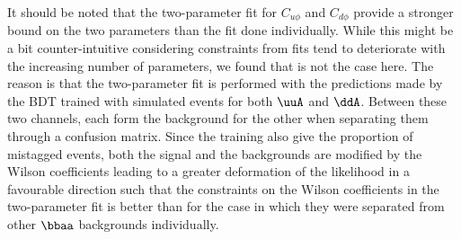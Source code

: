 It should be noted that the two-parameter fit for $C_{u\phi}$ and $C_{d\phi}$ provide a stronger bound on the two parameters than the fit done individually. While this might be a bit counter-intuitive considering constraints from fits tend to deteriorate with the increasing number of parameters, we found that is not the case here. The reason is that the two-parameter fit is performed with the predictions made by the BDT trained with simulated events for both $\uuA$ and $\ddA$. Between these two channels, each form the background for the other when separating them through a confusion matrix. Since the training also give the proportion of mistagged events, both the signal and the backgrounds are modified by the Wilson coefficients leading to a greater deformation of the likelihood in a favourable direction such that the constraints on the Wilson coefficients in the two-parameter fit is better than for the case in which they were separated from other $\bbaa$ backgrounds individually.
